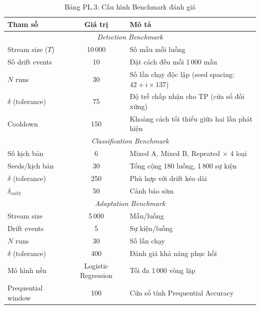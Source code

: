 \begin{table}[H]
	\centering
	\caption*{Bảng PL.3: Cấu hình Benchmark đánh giá}
	\begin{tabular}{|l|c|p{7cm}|}
		\hline
		\textbf{Tham số} & \textbf{Giá trị} & \textbf{Mô tả} \\
		\hline
		\multicolumn{3}{|c|}{\textit{Detection Benchmark}} \\
		\hline
		Stream size ($T$) & 10\,000 & Số mẫu mỗi luồng \\
		Số drift events & 10 & Đặt cách đều mỗi 1\,000 mẫu \\
		$N$ runs & 30 & Số lần chạy độc lập (seed spacing: $42 + i \times 137$) \\
		$\delta$ (tolerance) & 75 & Độ trễ chấp nhận cho TP (cửa sổ đối xứng) \\
		Cooldown & 150 & Khoảng cách tối thiểu giữa hai lần phát hiện \\
		\hline
		\multicolumn{3}{|c|}{\textit{Classification Benchmark}} \\
		\hline
		Số kịch bản & 6 & Mixed A, Mixed B, Repeated $\times$ 4 loại \\
		Seeds/kịch bản & 30 & Tổng cộng 180 luồng, 1\,800 sự kiện \\
		$\delta$ (tolerance) & 250 & Phù hợp với drift kéo dài \\
		$\delta_{\text{early}}$ & 50 & Cảnh báo sớm \\
		\hline
		\multicolumn{3}{|c|}{\textit{Adaptation Benchmark}} \\
		\hline
		Stream size & 5\,000 & Mẫu/luồng \\
		Drift events & 5 & Sự kiện/luồng \\
		$N$ runs & 30 & Số lần chạy \\
		$\delta$ (tolerance) & 400 & Đánh giá khả năng phục hồi \\
			Mô hình nền & Logistic Regression & Tối đa 1\,000 vòng lặp \\
		Prequential window & 100 & Cửa sổ tính Prequential Accuracy \\
		\hline
	\end{tabular}
\end{table}

